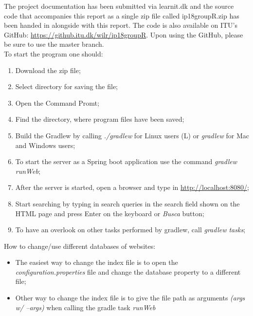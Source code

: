 The project documentation has been submitted via learnit.dk and the source code that accompanies this report as a single zip file called ip18groupR.zip has been handed in alongside with this report. The code is also available on ITU's GitHub: \url{https://github.itu.dk/wilr/ip18groupR}. Upon using the GitHub, please be sure to use the master branch.\\
To start the program one should:
\begin{enumerate}
    \item Download the zip file;
    \item Select directory for saving the file;
    \item Open the Command Promt;
    \item Find the directory, where program files have been saved;
    \item Build the Gradlew by calling  \textit{./gradlew} for Linux users (L) or \textit{gradlew} for Mac and Windows users;
    \item To start the server as a Spring boot application use the command \textit{gradlew runWeb};
    \item After the server is started, open a browser and type in \url{http://localhost:8080/};
    \item Start searching by typing in search queries in the search field shown on the HTML page and press Enter on the keyboard or \textit{Busca} button;
    \item To have an overlook on other tasks performed by gradlew, call \textit{gradlew tasks};
\end{enumerate}

How to change/use different databases of websites:
\begin{itemize}
    \item The easiest way to change the index file is to open the \textit{configuration.properties} file and change the database property to a different file;
    \item Other way to change the index file is to give the file path as arguments \textit{(args w/ --args)} when calling the gradle task \textit{runWeb}
\end{itemize}

